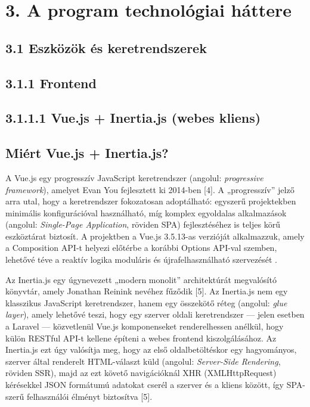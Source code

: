 \section{3. A program technológiai háttere}\label{a-program-technoluxf3giai-huxe1ttere}

\subsection{3.1 Eszközök és keretrendszerek}\label{eszkuxf6zuxf6k-uxe9s-keretrendszerek}

\subsection{3.1.1 Frontend}\label{frontend}

\subsection{3.1.1.1 Vue.js + Inertia.js (webes kliens)}\label{vue.js-inertia.js-webes-kliens}

\subsection{Miért Vue.js + Inertia.js?}\label{miuxe9rt-vue.js-inertia.js}

A Vue.js egy progresszív JavaScript keretrendszer (angolul: \emph{progressive framework}), amelyet Evan You fejlesztett ki 2014-ben {[}4{]}. A „progresszív'' jelző arra utal, hogy a keretrendszer fokozatosan adoptálható: egyszerű projektekben minimális konfigurációval használható, míg komplex egyoldalas alkalmazások (angolul: \emph{Single-Page Application}, röviden SPA) fejlesztéséhez is teljes körű eszköztárat biztosít. A projektben a Vue.js 3.5.13-as verzióját alkalmazzuk, amely a Composition API-t helyezi előtérbe a korábbi Options API-val szemben, lehetővé téve a reaktív logika moduláris és újrafelhasználható szervezését .

Az Inertia.js egy úgynevezett „modern monolit'' architektúrát megvalósító könyvtár, amely Jonathan Reinink nevéhez fűződik {[}5{]}. Az Inertia.js nem egy klasszikus JavaScript keretrendszer, hanem egy összekötő réteg (angolul: \emph{glue layer}), amely lehetővé teszi, hogy egy szerver oldali keretrendszer --- jelen esetben a Laravel --- közvetlenül Vue.js komponenseket renderelhessen anélkül, hogy külön RESTful API-t kellene építeni a webes frontend kiszolgálásához. Az Inertia.js ezt úgy valósítja meg, hogy az első oldalbetöltéskor egy hagyományos, szerver által renderelt HTML-választ küld (angolul: \emph{Server-Side Rendering}, röviden SSR), majd az ezt követő navigációknál XHR (XMLHttpRequest) kérésekkel JSON formátumú adatokat cserél a szerver és a kliens között, így SPA-szerű felhasználói élményt biztosítva {[}5{]}.

